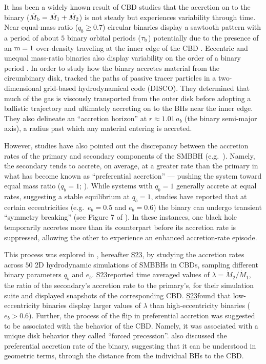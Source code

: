 \documentclass[fleqn,usenatbib]{mnras}
\newcommand{\Stwentythree}{\href{https://doi.org/10.1093/mnras/stac3263}{S23}}
\begin{document}
It has been a widely known result of CBD studies that the accretion on to the binary ($\dot{M}_{\rm{b}} = \dot{M}_1 + \dot{M}_2$) is not steady but experiences variability through time. Near equal-mass ratio ($q_b\ge0.7$) circular binaries display a sawtooth pattern with a period of about $5$ binary orbital periods ($\tau_{\rm{b}}$) potentially due to the presence of an $\rm{m}=1$ over-density traveling at the inner edge of the CBD \citep{MacFadyen_08, miranda_munoz_lai_2017, munoz_miranda_lai_19,ryan_2022}. Eccentric and unequal mass-ratio binaries also display variability on the order of a binary period \citep{miranda_munoz_lai_2017, munoz_miranda_lai_19, ryan_2022}. In order to study how the binary accretes material from the circumbinary disk, \citet{Tiede_22} tracked the paths of passive tracer particles in a two-dimensional grid-based hydrodynamical code (DISCO). They determined that much of the gas is viscously transported from the outer disk before adopting a ballistic trajectory and ultimately accreting on to the BHs near the inner edge. They also delineate an ``accretion horizon'' at $r \approx 1.01 \, a_b$ (the binary semi-major axis), a radius past which any material entering is accreted.

However, studies have also pointed out the discrepancy between the accretion rates of the primary and secondary components of the SMBBH (e.g.\ \citealt{miranda_munoz_lai_2017, siwek_prefacc, Dorazio_24_pref_mention}). Namely, the secondary tends to accrete, on average, at a greater rate than the primary in what has become known as ``preferential accretion'' --- pushing the system toward equal mass ratio ($q_b = 1$; \citealt{farris_2014, duffell_dorazio_2020, miranda_munoz_lai_2017, siwek_prefacc}). While systems with $q_b = 1$ generally accrete at equal rates, suggesting a stable equilibrium at $q_b = 1$, studies have reported that at certain eccentricities (e.g.\ $e_b = 0.5$ and $e_b = 0.6$) the binary can undergo transient ``symmetry breaking'' (see Figure 7 of \citealt{munoz_miranda_lai_19}). In these instances, one black hole temporarily accretes more than its counterpart before its accretion rate is suppressed, allowing the other to experience an enhanced accretion-rate episode.
 

This process was explored in \citealt{siwek_prefacc}, hereafter \Stwentythree, by studying the accretion rates across $50$ 2D hydrodynamic simulations of SMBBHs in CBDs, sampling different binary parameters $q_b$ and $e_b$. \Stwentythree reported time averaged values of $\lambda = \dot{M}_2/\dot{M}_1$, the ratio of the secondary's accretion rate to the primary's, for their simulation suite and displayed snapshots of the corresponding CBD. \Stwentythree found that low-eccentricity binaries display larger values of $\lambda$ than high-eccentricity binaries ($e_b > 0.6$). Further, the process of the flip in preferential accretion was suggested to be associated with the behavior of the CBD. Namely, it was associated with a unique disk behavior they called ``forced precession''. \citealt{DeLaurentiis24} also discussed the preferential accretion rate of the binary, suggesting that it can be understood in geometric terms, through the distance from the individual BHs to the CBD. 
\end{document}
